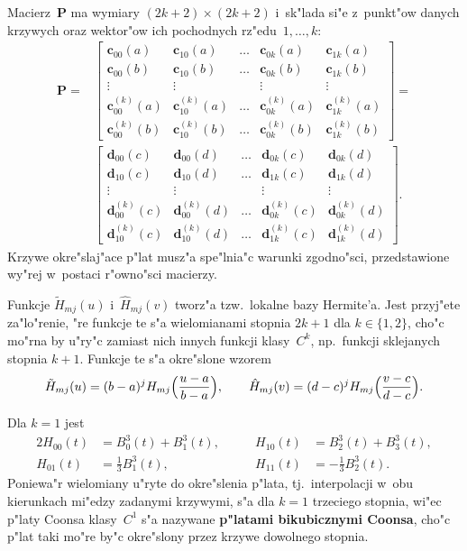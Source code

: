 Macierz~$\bm{P}$ ma wymiary $(2k+2)\times(2k+2)$ i~sk"lada si"e z~punkt"ow
danych krzywych oraz wektor"ow ich pochodnych rz"edu~$1,\ldots,k$:
\begin{align}\label{eq:Coons:compat:cond}
  \bm{P} ={}& \left[\begin{array}{ccccc}
    \bm{c}_{00}(a) & \bm{c}_{10}(a) & \ldots & \bm{c}_{0k}(a) & \bm{c}_{1k}(a) \\
    \bm{c}_{00}(b) & \bm{c}_{10}(b) & \ldots & \bm{c}_{0k}(b) & \bm{c}_{1k}(b) \\
    \vdots & \vdots & & \vdots & \vdots \\
    \bm{c}^{(k)}_{00}(a) & \bm{c}^{(k)}_{10}(a) & \ldots &
    \bm{c}^{(k)}_{0k}(a) & \bm{c}^{(k)}_{1k}(a) \\
    \bm{c}^{(k)}_{00}(b) & \bm{c}^{(k)}_{10}(b) & \ldots &
    \bm{c}^{(k)}_{0k}(b) & \bm{c}^{(k)}_{1k}(b)
  \end{array}\right] = \nonumber \\
 &\left[\begin{array}{ccccc}
    \bm{d}_{00}(c) & \bm{d}_{00}(d) & \ldots & \bm{d}_{0k}(c) & \bm{d}_{0k}(d) \\
    \bm{d}_{10}(c) & \bm{d}_{10}(d) & \ldots & \bm{d}_{1k}(c) & \bm{d}_{1k}(d) \\
    \vdots & \vdots & & \vdots & \vdots \\
    \bm{d}^{(k)}_{00}(c) & \bm{d}^{(k)}_{00}(d) & \ldots &
    \bm{d}^{(k)}_{0k}(c) & \bm{d}^{(k)}_{0k}(d) \\
    \bm{d}^{(k)}_{10}(c) & \bm{d}^{(k)}_{10}(d) & \ldots &
    \bm{d}^{(k)}_{1k}(c) & \bm{d}^{(k)}_{1k}(d)
  \end{array}\right].
\end{align}
Krzywe okre"slaj"ace p"lat musz"a spe"lnia"c warunki zgodno"sci, przedstawione
wy"rej w~postaci r"owno"sci macierzy.

Funkcje $\tilde{H}_{mj}(u)$ i~$\hat{H}_{mj}(v)$ tworz"a tzw.\ lokalne bazy
Hermite'a. Jest przyj"ete za"lo"renie,
"re funkcje te s"a wielomianami stopnia $2k+1$ dla $k\in\{1,2\}$, cho"c mo"rna
by u"ry"c zamiast nich innych funkcji klasy~$C^k$, np.\ funkcji sklejanych stopnia
$k+1$. Funkcje te s"a okre"slone wzorem
\begin{align*}
  \tilde{H}_{mj}(u) = (b-a)^jH_{mj}\Bigl(\frac{u-a}{b-a}\Bigr),\qquad
  \hat{H}_{mj}(v) = (d-c)^jH_{mj}\Bigl(\frac{v-c}{d-c}\Bigr).
\end{align*}

Dla $k=1$ jest
\begin{alignat*}{2}
  H_{00}(t) &{}= B^3_0(t)+B^3_1(t),\qquad &
  H_{10}(t) &{}= B^3_2(t)+B^3_3(t),\\
  H_{01}(t) &{}= \frac{1}{3}B^3_1(t),\qquad &
  H_{11}(t) &{}= -\frac{1}{3}B^3_2(t).
\end{alignat*}
Poniewa"r wielomiany u"ryte do okre"slenia p"lata, tj.\ interpolacji
w~obu kierunkach mi"edzy zadanymi krzywymi, s"a dla $k=1$ trzeciego stopnia,
wi"ec p"laty Coonsa klasy~$C^1$ s"a nazywane \textbf{p"latami bikubicznymi
Coonsa}, cho"c p"lat taki mo"re by"c okre"slony przez krzywe dowolnego
stopnia.

